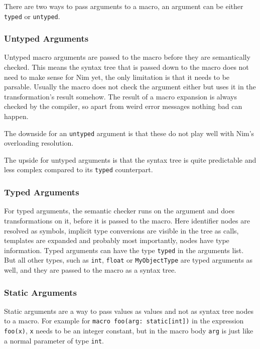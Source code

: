 There are two ways to pass arguments to a macro, an argument can be
either \texttt{typed} or \texttt{untyped}.

\hypertarget{untyped-arguments}{%
\subsubsection{Untyped Arguments}\label{untyped-arguments}}

Untyped macro arguments are passed to the macro before they are
semantically checked. This means the syntax tree that is passed down to
the macro does not need to make sense for Nim yet, the only limitation
is that it needs to be parsable. Usually the macro does not check the
argument either but uses it in the transformation's result somehow. The
result of a macro expansion is always checked by the compiler, so apart
from weird error messages nothing bad can happen.

The downside for an \texttt{untyped} argument is that these do not play
well with Nim's overloading resolution.

The upside for untyped arguments is that the syntax tree is quite
predictable and less complex compared to its \texttt{typed} counterpart.

\hypertarget{typed-arguments}{%
\subsubsection{Typed Arguments}\label{typed-arguments}}

For typed arguments, the semantic checker runs on the argument and does
transformations on it, before it is passed to the macro. Here identifier
nodes are resolved as symbols, implicit type conversions are visible in
the tree as calls, templates are expanded and probably most importantly,
nodes have type information. Typed arguments can have the type
\texttt{typed} in the arguments list. But all other types, such as
\texttt{int}, \texttt{float} or \texttt{MyObjectType} are typed
arguments as well, and they are passed to the macro as a syntax tree.

\hypertarget{static-arguments}{%
\subsubsection{Static Arguments}\label{static-arguments}}

Static arguments are a way to pass values as values and not as syntax
tree nodes to a macro. For example for
\texttt{macro\ foo(arg:\ static{[}int{]})} in the expression
\texttt{foo(x)}, \texttt{x} needs to be an integer constant, but in the
macro body \texttt{arg} is just like a normal parameter of type
\texttt{int}.

